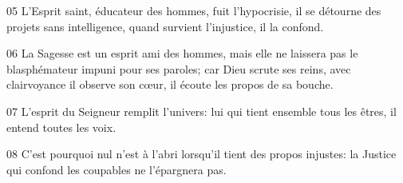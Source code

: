 
05 L’Esprit saint, éducateur des hommes, fuit l’hypocrisie, il se détourne des projets sans intelligence, quand survient l’injustice, il la confond.

06 La Sagesse est un esprit ami des hommes, mais elle ne laissera pas le blasphémateur impuni pour ses paroles; car Dieu scrute ses reins, avec clairvoyance il observe son cœur, il écoute les propos de sa bouche.

07 L’esprit du Seigneur remplit l’univers: lui qui tient ensemble tous les êtres, il entend toutes les voix.

08 C’est pourquoi nul n’est à l’abri lorsqu’il tient des propos injustes: la Justice qui confond les coupables ne l’épargnera pas.

